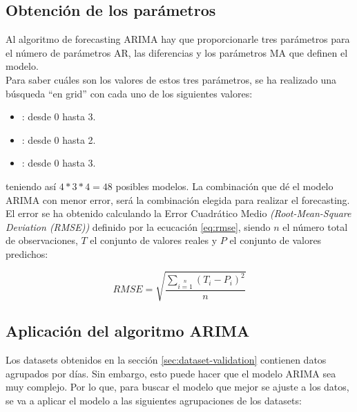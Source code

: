 \subsection{Obtención de los parámetros }

Al algoritmo de forecasting ARIMA \citep{arima} hay que proporcionarle tres parámetros  para el número de parámetros AR, las diferencias y los parámetros MA que definen el modelo. \\

Para saber cuáles son los valores de estos tres parámetros, se ha realizado una búsqueda ``en grid'' con cada uno de los siguientes valores:

\begin{itemize}
 \item {}: desde 0 hasta 3.
 \item {}: desde 0 hasta 2.
 \item {}: desde 0 hasta 3.
\end{itemize}

teniendo así $4*3*4 = 48$ posibles modelos. La combinación  que dé el modelo ARIMA con menor error, será la combinación elegida para realizar el forecasting. El error se ha obtenido calculando la Error Cuadrático Medio \textit{(Root-Mean-Square Deviation (RMSE))} definido por la ecucación \ref{eq:rmse}, siendo $n$ el número total de observaciones, $T$ el conjunto de valores reales y $P$ el conjunto de valores predichos:

\begin{equation}
 RMSE = \sqrt{\frac{\sum\limits_{i=1}\limits^{n} (T_i - P_i) ^ 2}{n}}
\label{eq:rmse}
\end{equation}




\subsection{Aplicación del algoritmo ARIMA}

Los datasets obtenidos en la sección \ref{sec:dataset-validation} contienen datos agrupados por días. Sin embargo, esto puede hacer que el modelo ARIMA sea muy complejo. Por lo que, para buscar el modelo que mejor se ajuste a los datos, se va a aplicar el modelo a las siguientes agrupaciones de los datasets:


